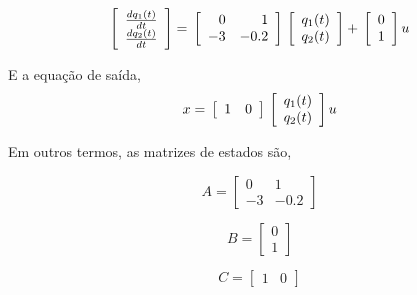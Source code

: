 \documentclass[a4paper, 10pt]{article}
\begin{document}
\begin{list}{\textbf{Questão .}}{
\setlength{\labelwidth}{-2mm} \setlength{\parsep}{0mm}
\setlength{\topsep}{0mm} \setlength{\leftmargin}{0mm}}
        
        \begin{equation}
          \left[\begin{array}{c}
          \frac{d q_1(t)}{d t} \\
          \frac{d q_2(t)}{d t}
          \end{array}\right] = \\
          \left[\begin{array}{rr}
          0 & 1 \\
          -3 & -0.2
          \end{array}\right]  \\
          \left[\begin{array}{c}
          q_1(t) \\
          q_2(t)
          \end{array}\right] + \\
          \left[\begin{array}{r}
          0 \\
          1
          \end{array}\right] u
        \end{equation}


		E a equação de saída,
        \begin{equation}
          x = \\
          \left[\begin{array}{rr}
          1 & 0
          \end{array}\right] \\
          \left[\begin{array}{c}
          q_1(t) \\
          q_2(t)
          \end{array}\right] u
		\end{equation}
        
        
        Em outros termos, as matrizes de estados são,
        
        $$
        A =\left[\begin{array}{rr}
          0 & 1 \\
          -3 & -0.2
          \end{array}\right]
        $$
        
        $$
        B = \left[\begin{array}{r}
          0 \\
          1
          \end{array}\right]
        $$
        
        $$
        C = \left[\begin{array}{rr}
          1 & 0
          \end{array}\right]
        $$
        

\end{list}
\end{document}
